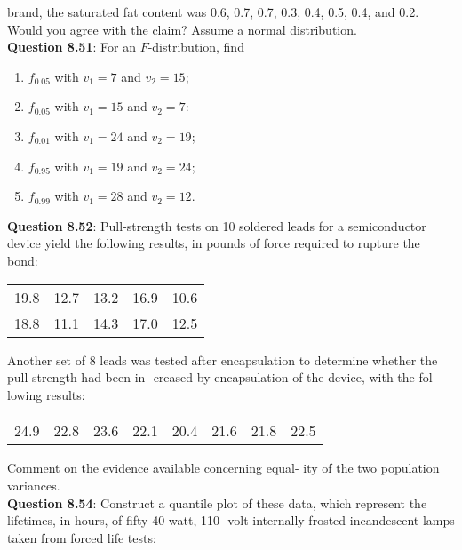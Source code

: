 \documentclass{article}
\begin{document}
    brand, the saturated fat content was 0.6, 0.7, 0.7, 0.3,
    0.4, 0.5, 0.4, and 0.2. Would you agree with the claim?
    Assume a normal distribution.\\\newline
    \textbf{Question 8.51}: For an $F$-distribution, find
        \begin{enumerate}[label = (\alph*) ]
            \item $f_{0.05}$ with $v_1 = 7$ and $v_2 = 15$;
            \item $f_{0.05}$ with $v_1 = 15$ and $v_2 = 7$:
            \item $f_{0.01}$ with $v_1 = 24$ and $v_2 = 19$;
            \item $f_{0.95}$ with $v_1 = 19$ and $v_2 = 24$;
            \item $f_{0.99}$ with $v_1 = 28$ and $v_2 = 12$.
        \end{enumerate}
    \textbf{Question 8.52}: Pull-strength tests on 10 soldered leads for a
    semiconductor device yield the following results, in
    pounds of force required to rupture the bond:
        \begin{center}
            \begin{tabular}{c c c c c}
                19.8 & 12.7 & 13.2 & 16.9 & 10.6 \\
                18.8 & 11.1 & 14.3 & 17.0 & 12.5
            \end{tabular}
        \end{center}
    Another set of 8 leads was tested after encapsulation
    to determine whether the pull strength had been in-
    creased by encapsulation of the device, with the fol-
    lowing results:
        \begin{center}
            \begin{tabular}{c c c c c c c c}
                24.9 & 22.8 & 23.6 & 22.1 & 20.4 & 21.6 & 21.8 & 22.5
            \end{tabular}
        \end{center}
    Comment on the evidence available concerning equal-
    ity of the two population variances.\\\newline
    \textbf{Question 8.54}: Construct a quantile plot of these data, which
    represent the lifetimes, in hours, of fifty 40-watt, 110-
    volt internally frosted incandescent lamps taken from
    forced life tests:
\end{document}
